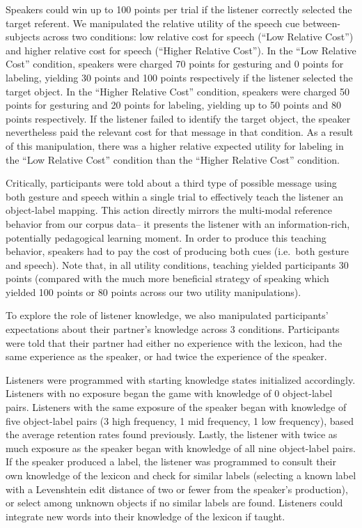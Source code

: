 \documentclass[english,,man,floatsintext]{apa6}
\begin{document}
Speakers could win up to 100 points per trial if the listener correctly selected the target referent. We manipulated the relative utility of the speech cue between-subjects across two conditions: low relative cost for speech (\enquote{Low Relative Cost}) and higher relative cost for speech (\enquote{Higher Relative Cost}). In the \enquote{Low Relative Cost} condition, speakers were charged 70 points for gesturing and 0 points for labeling, yielding 30 points and 100 points respectively if the listener selected the target object. In the \enquote{Higher Relative Cost} condition, speakers were charged 50 points for gesturing and 20 points for labeling, yielding up to 50 points and 80 points respectively. If the listener failed to identify the target object, the speaker nevertheless paid the relevant cost for that message in that condition. As a result of this manipulation, there was a higher relative expected utility for labeling in the \enquote{Low Relative Cost} condition than the \enquote{Higher Relative Cost} condition.

Critically, participants were told about a third type of possible message using both gesture and speech within a single trial to effectively teach the listener an object-label mapping. This action directly mirrors the multi-modal reference behavior from our corpus data-- it presents the listener with an information-rich, potentially pedagogical learning moment. In order to produce this teaching behavior, speakers had to pay the cost of producing both cues (i.e.~both gesture and speech). Note that, in all utility conditions, teaching yielded participants 30 points (compared with the much more beneficial strategy of speaking which yielded 100 points or 80 points across our two utility manipulations).

To explore the role of listener knowledge, we also manipulated participants' expectations about their partner's knowledge across 3 conditions. Participants were told that their partner had either no experience with the lexicon, had the same experience as the speaker, or had twice the experience of the speaker.

Listeners were programmed with starting knowledge states initialized accordingly. Listeners with no exposure began the game with knowledge of 0 object-label pairs. Listeners with the same exposure of the speaker began with knowledge of five object-label pairs (3 high frequency, 1 mid frequency, 1 low frequency), based the average retention rates found previously. Lastly, the listener with twice as much exposure as the speaker began with knowledge of all nine object-label pairs. If the speaker produced a label, the listener was programmed to consult their own knowledge of the lexicon and check for similar labels (selecting a known label with a Levenshtein edit distance of two or fewer from the speaker's production), or select among unknown objects if no similar labels are found. Listeners could integrate new words into their knowledge of the lexicon if taught.
\end{document}
